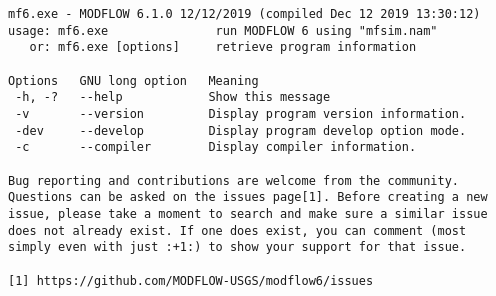 {\small
\begin{lstlisting}[style=modeloutput]
mf6.exe - MODFLOW 6.1.0 12/12/2019 (compiled Dec 12 2019 13:30:12)
usage: mf6.exe               run MODFLOW 6 using "mfsim.nam"
   or: mf6.exe [options]     retrieve program information

Options   GNU long option   Meaning
 -h, -?   --help            Show this message
 -v       --version         Display program version information.
 -dev     --develop         Display program develop option mode.
 -c       --compiler        Display compiler information.

Bug reporting and contributions are welcome from the community.
Questions can be asked on the issues page[1]. Before creating a new
issue, please take a moment to search and make sure a similar issue
does not already exist. If one does exist, you can comment (most
simply even with just :+1:) to show your support for that issue.

[1] https://github.com/MODFLOW-USGS/modflow6/issues


\end{lstlisting}
}
